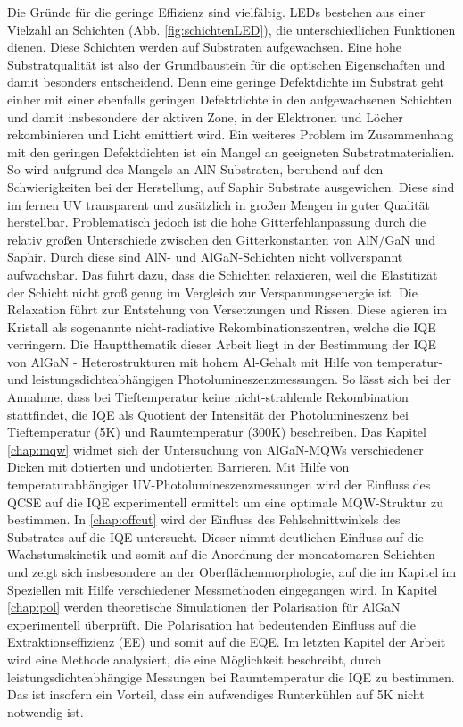 Die Gründe für die geringe Effizienz sind vielfältig. LEDs bestehen aus einer Vielzahl an Schichten (Abb. \ref{fig:schichtenLED}), die unterschiedlichen Funktionen dienen. Diese Schichten werden auf Substraten aufgewachsen. Eine hohe Substratqualität ist also der Grundbaustein für die optischen Eigenschaften und damit besonders entscheidend. Denn eine geringe Defektdichte im Substrat geht einher mit einer ebenfalls geringen Defektdichte in den aufgewachsenen Schichten und damit insbesondere der aktiven Zone, in der Elektronen und Löcher rekombinieren und Licht emittiert wird. Ein weiteres Problem im Zusammenhang mit den geringen Defektdichten ist ein Mangel an geeigneten Substratmaterialien. So wird aufgrund des Mangels an AlN-Substraten, beruhend auf den Schwierigkeiten bei der Herstellung, auf Saphir Substrate ausgewichen. Diese sind im fernen UV transparent und zusätzlich in großen Mengen in guter Qualität herstellbar. Problematisch jedoch ist die hohe Gitterfehlanpassung durch die relativ großen Unterschiede zwischen den Gitterkonstanten von AlN/GaN und Saphir. Durch diese sind AlN- und AlGaN-Schichten nicht vollverspannt aufwachsbar. Das führt dazu, dass die Schichten relaxieren, weil die Elastitizät der Schicht nicht groß genug im Vergleich zur Verspannungsenergie ist. Die Relaxation führt zur Entstehung von Versetzungen und Rissen. Diese agieren im Kristall als sogenannte nicht-radiative Rekombinationszentren, welche die IQE verringern. Die Hauptthematik dieser Arbeit liegt in der  Bestimmung der IQE von AlGaN - Heterostrukturen mit hohem Al-Gehalt mit Hilfe von temperatur- und leistungsdichteabhängigen Photolumineszenzmessungen.
So lässt sich bei der Annahme, dass bei Tieftemperatur keine nicht-strahlende Rekombination stattfindet, die IQE als Quotient der Intensität der Photolumineszenz bei Tieftemperatur (5K) und Raumtemperatur (300K) beschreiben.  
Das Kapitel \ref{chap:mqw} widmet sich der Untersuchung von AlGaN-MQWs verschiedener Dicken mit dotierten und undotierten Barrieren. Mit Hilfe von temperaturabhängiger UV-Photolumineszenzmessungen wird der Einfluss des QCSE auf die IQE experimentell ermittelt um eine optimale MQW-Struktur zu bestimmen.
In \ref{chap:offcut} wird der Einfluss des Fehlschnittwinkels des Substrates auf die IQE untersucht. Dieser nimmt deutlichen Einfluss auf die Wachstumskinetik und somit auf die Anordnung der monoatomaren Schichten und zeigt sich insbesondere an der Oberflächenmorphologie, auf die im Kapitel im Speziellen mit Hilfe verschiedener Messmethoden eingegangen wird.
In Kapitel \ref{chap:pol} werden theoretische Simulationen der Polarisation für AlGaN experimentell überprüft. Die Polarisation hat bedeutenden Einfluss auf die Extraktionseffizienz (EE) und somit auf die EQE.
Im letzten Kapitel der Arbeit wird eine Methode analysiert, die eine Möglichkeit beschreibt, durch leistungsdichteabhängige Messungen bei Raumtemperatur die IQE zu bestimmen. Das ist insofern ein Vorteil, dass ein aufwendiges Runterkühlen auf 5K nicht notwendig ist. 













